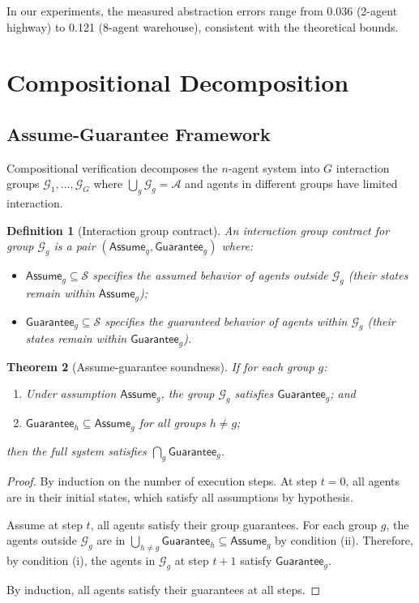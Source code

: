 \documentclass[11pt]{article}
\newtheorem{theorem}{Theorem}[section]
\newtheorem{definition}[theorem]{Definition}
\newcommand{\calS}{\mathcal{S}}
\newcommand{\calA}{\mathcal{A}}
\newcommand{\calG}{\mathcal{G}}
\begin{document}
In our experiments, the measured abstraction errors range from 0.036
(2-agent highway) to 0.121 (8-agent warehouse), consistent with the
theoretical bounds.


\section{Compositional Decomposition}
\label{app:composition}

\subsection{Assume-Guarantee Framework}

Compositional verification decomposes the $n$-agent system into $G$
interaction groups $\calG_1, \ldots, \calG_G$ where $\bigcup_g \calG_g = \calA$
and agents in different groups have limited interaction.

\begin{definition}[Interaction group contract]
An \emph{interaction group contract} for group $\calG_g$ is a pair
$(\mathsf{Assume}_g, \mathsf{Guarantee}_g)$ where:
\begin{itemize}[nosep]
\item $\mathsf{Assume}_g \subseteq \calS$ specifies the assumed behavior of
agents outside $\calG_g$ (their states remain within $\mathsf{Assume}_g$);
\item $\mathsf{Guarantee}_g \subseteq \calS$ specifies the guaranteed behavior
of agents within $\calG_g$ (their states remain within $\mathsf{Guarantee}_g$).
\end{itemize}
\end{definition}

\begin{theorem}[Assume-guarantee soundness]
\label{thm:ag-sound}
If for each group $g$:
\begin{enumerate}[nosep,label=(\roman*)]
\item Under assumption $\mathsf{Assume}_g$, the group $\calG_g$ satisfies
$\mathsf{Guarantee}_g$; and
\item $\mathsf{Guarantee}_h \subseteq \mathsf{Assume}_g$ for all groups $h \neq g$;
\end{enumerate}
then the full system satisfies $\bigcap_g \mathsf{Guarantee}_g$.
\end{theorem}

\begin{proof}
By induction on the number of execution steps. At step $t=0$, all agents are
in their initial states, which satisfy all assumptions by hypothesis.

Assume at step $t$, all agents satisfy their group guarantees. For each
group $g$, the agents outside $\calG_g$ are in $\bigcup_{h \neq g} \mathsf{Guarantee}_h
\subseteq \mathsf{Assume}_g$ by condition (ii). Therefore, by condition (i),
the agents in $\calG_g$ at step $t+1$ satisfy $\mathsf{Guarantee}_g$.

By induction, all agents satisfy their guarantees at all steps.
\end{proof}
\end{document}
